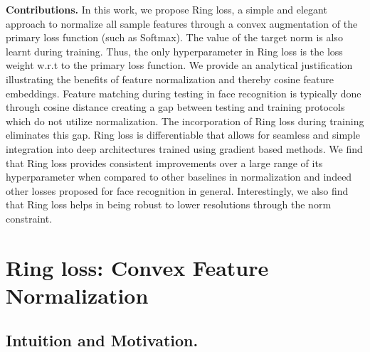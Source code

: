 \documentclass[10pt,twocolumn,letterpaper]{article}
\begin{document}
\textbf{Contributions.} In this work, we propose Ring loss, a simple and elegant approach to normalize all sample features through a convex augmentation of the primary loss function (such as Softmax). The value of the target norm is also learnt during training. Thus, the only hyperparameter in Ring  loss is the loss weight w.r.t to the primary loss function. We provide an analytical justification illustrating the benefits of feature normalization and thereby cosine feature embeddings. Feature matching during testing in face recognition is typically done through cosine distance creating a gap between testing and training protocols which do not utilize normalization. The incorporation of Ring loss during training eliminates this gap. Ring loss is differentiable that allows for seamless and simple integration into deep architectures trained using gradient based methods. We find that Ring loss provides consistent improvements over a large range of its hyperparameter when compared to other baselines in normalization and indeed other losses proposed for face recognition in general. Interestingly, we also find that Ring loss helps in being robust to lower resolutions through the norm constraint.














\section{Ring loss: Convex Feature Normalization}


\subsection{Intuition and Motivation. } 

\end{document}
